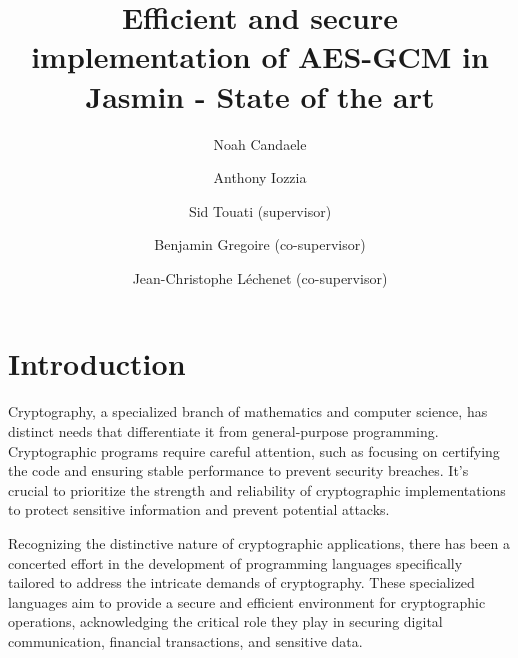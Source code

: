 \documentclass[runningheads]{llncs}
\begin{document}
%
\title{Efficient and secure implementation of AES-GCM in Jasmin - State of the art}


%
%
\author{Noah Candaele \and Anthony Iozzia \and Sid Touati (supervisor) \and Benjamin Gregoire (co-supervisor) \and Jean-Christophe Léchenet (co-supervisor)}

%
%



%
\maketitle              %
%

\thispagestyle{plain} %

%

%
%
%

\section{Introduction}

Cryptography, a specialized branch of mathematics and computer science, has distinct needs that differentiate it from general-purpose programming. Cryptographic programs require careful attention, such as focusing on certifying the code and ensuring stable performance to prevent security breaches. It's crucial to prioritize the strength and reliability of cryptographic implementations to protect sensitive information and prevent potential attacks.

Recognizing the distinctive nature of cryptographic applications, there has been a concerted effort in the development of programming languages specifically tailored to address the intricate demands of cryptography. These specialized languages aim to provide a secure and efficient environment for cryptographic operations, acknowledging the critical role they play in securing digital communication, financial transactions, and sensitive data.
\end{document}
